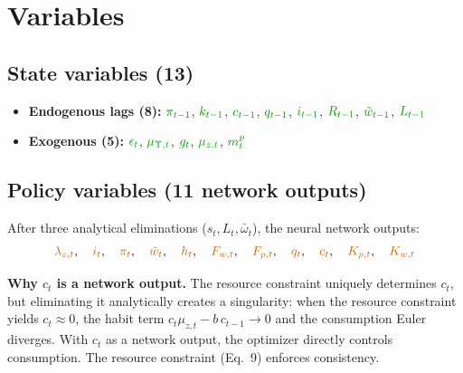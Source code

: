 \documentclass[11pt]{article}
\begin{document}
\section{Variables}

\subsection{State variables (13)}

\begin{itemize}
\item \textbf{Endogenous lags (8):}\;
  $\textcolor{green!60!black}{\pi_{t-1}}$,\;
  $\textcolor{green!60!black}{k_{t-1}}$,\;
  $\textcolor{green!60!black}{c_{t-1}}$,\;
  $\textcolor{green!60!black}{q_{t-1}}$,\;
  $\textcolor{green!60!black}{i_{t-1}}$,\;
  $\textcolor{green!60!black}{R_{t-1}}$,\;
  $\textcolor{green!60!black}{\tilde{w}_{t-1}}$,\;
  $\textcolor{green!60!black}{L_{t-1}}$

\item \textbf{Exogenous (5):}\;
  $\textcolor{green!60!black}{\epsilon_t}$,\;
  $\textcolor{green!60!black}{\mu_{\Upsilon,t}}$,\;
  $\textcolor{green!60!black}{g_t}$,\;
  $\textcolor{green!60!black}{\mu_{z,t}}$,\;
  $\textcolor{green!60!black}{m_t^p}$
\end{itemize}

\subsection{Policy variables (11 network outputs)}

After three analytical eliminations ($s_t, L_t, \bar\omega_t$), the neural
network outputs:
\[
  \textcolor{orange!80!black}{\lambda_{z,t}},\quad
  \textcolor{orange!80!black}{i_t},\quad
  \textcolor{orange!80!black}{\pi_t},\quad
  \textcolor{orange!80!black}{\tilde{w}_t},\quad
  \textcolor{orange!80!black}{h_t},\quad
  \textcolor{orange!80!black}{F_{w,t}},\quad
  \textcolor{orange!80!black}{F_{p,t}},\quad
  \textcolor{orange!80!black}{q_t},\quad
  \textcolor{orange!80!black}{c_t},\quad
  \textcolor{orange!80!black}{K_{p,t}},\quad
  \textcolor{orange!80!black}{K_{w,t}}
\]

\noindent\textbf{Why $c_t$ is a network output.}\;
The resource constraint uniquely determines $c_t$, but eliminating it
analytically creates a singularity: when the resource constraint yields
$c_t \approx 0$, the habit term $c_t\mu_{z,t} - b\,c_{t-1} \to 0$ and
the consumption Euler diverges. With $c_t$ as a network output, the optimizer
directly controls consumption. The resource constraint (Eq.~9) enforces
consistency.
\end{document}
